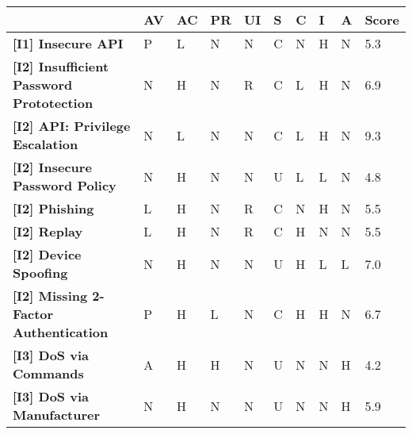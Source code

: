 \begin{sidewaystable}
\centering
\begin{tabularx}{\textwidth}{|l|X|X|X|X|X|X|X|X|l|}
\hline
                                                     & \textbf{AV} & \textbf{AC} & \textbf{PR} & \textbf{UI} & \textbf{S} & \textbf{C} & \textbf{I} & \textbf{A} & \textbf{Score} \\ \hline
\textbf{{[}I1{]} Insecure API}                       & P           & L           & N           & N           & C          & N          & H          & N          & 5.3            \\ \hline
\textbf{{[}I2{]} Insufficient Password Prototection} & N           & H           & N           & R           & C          & L          & H          & N          & 6.9            \\ \hline
\textbf{{[}I2{]} API: Privilege Escalation}          & N           & L           & N           & N           & C          & L          & H          & N          & 9.3            \\ \hline
\textbf{{[}I2{]} Insecure Password Policy}           & N           & H           & N           & N           & U          & L          & L          & N          & 4.8            \\ \hline
\textbf{{[}I2{]} Phishing}                           & L           & H           & N           & R           & C          & N          & H          & N          & 5.5            \\ \hline
\textbf{{[}I2{]} Replay}                             & L           & H           & N           & R           & C          & H          & N          & N          & 5.5            \\ \hline
\textbf{{[}I2{]} Device Spoofing}                    & N           & H           & N           & N           & U          & H          & L          & L          & 7.0            \\ \hline
\textbf{{[}I2{]} Missing 2-Factor Authentication}    & P           & H           & L           & N           & C          & H          & H          & N          & 6.7            \\ \hline
\textbf{{[}I3{]} DoS via Commands}                   & A           & H           & H           & N           & U          & N          & N          & H          & 4.2            \\ \hline
\textbf{{[}I3{]} DoS via Manufacturer}               & N           & H           & N           & N           & U          & N          & N          & H          & 5.9            \\ \hline

\end{tabularx}
\end{sidewaystable}
